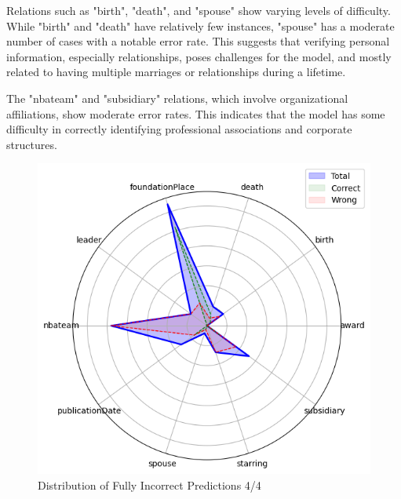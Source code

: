 Relations such as "birth", "death", and "spouse" show varying levels of difficulty.
While "birth" and "death" have relatively few instances, "spouse" has a moderate number of cases with a notable error rate.
This suggests that verifying personal information, especially relationships, poses challenges for the model, and mostly related to having multiple marriages or relationships during a lifetime.

The "nbateam" and "subsidiary" relations, which involve organizational affiliations, show moderate error rates.
This indicates that the model has some difficulty in correctly identifying professional associations and corporate structures.

\begin{figure}[ht!]
    \centering
    \begin{minipage}[b]{0.4\textwidth}
        \centering
        \includegraphics[width=\textwidth]{res/radar-error-0}
        \caption{Distribution of Fully Incorrect Predictions 4/4}
        \label{fig:wrong_prediction_distribution_0}
    \end{minipage}
    \hspace{0.05\textwidth} %
    \begin{minipage}[b]{0.4\textwidth}
        \centering

\end{minipage}
\end{figure}
